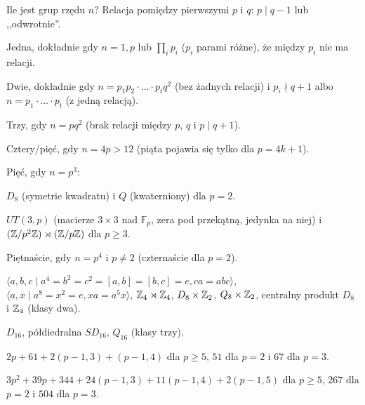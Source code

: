 Ile jest grup rzędu $n$?
Relacja pomiędzy pierwszymi $p$ i $q$: $p \mid q - 1$ lub ,,odwrotnie''.
\begin{itemx}
	\item {\color{Blue} Jedna}, dokładnie gdy $n = 1, p$ lub $\prod_i p_i$ ($p_i$ parami różne), że między $p_i$ nie ma relacji.
	\item {\color{Blue} Dwie}, dokładnie gdy $n = p_1 p_2 \cdot \ldots \cdot p_t q^2$ (bez żadnych relacji) i $p_i \nmid q + 1$ albo $n = p_1\cdot \ldots \cdot p_t$ (z jedną relacją).
	\item {\color{Blue} Trzy}, gdy $n = pq^2$ (brak relacji między $p$, $q$ i $p \mid q + 1$).
	\item {\color{Blue} Cztery/pięć}, gdy $n = 4p > 12$ (piąta pojawia się tylko dla $p = 4k+1$).
	\item {\color{Blue} Pięć}, gdy $n = p^3$:
	\begin{itemx}
	\item $D_8$ (symetrie kwadratu) i $Q$ (kwaterniony) dla $p = 2$.
	\item $UT(3, p)$ (macierze $3 \times 3$ nad $\mathbb F_p$, zera pod przekątną, jedynka na niej) i $(\mathbb{Z}/p^2\mathbb{Z}) \rtimes (\mathbb{Z}/p\mathbb{Z})$ dla $p \ge 3$.
	\end{itemx} 
	\item {\color{Blue} Piętnaście}, gdy $n = p^4$ i $p \neq 2$ (czternaście dla $p = 2$).
	\begin{itemx}
	\item $\langle a,b,c \mid a^4 = b^2 = c^2 = [a,b] = [b,c] = e, ca = abc\rangle$, $\langle a, x \mid a^8 = x^2 = e, xa = a^5x\rangle$, $\mathbb{Z}_4 \rtimes \mathbb{Z}_4$, $D_8 \times \mathbb{Z}_2$, $Q_8 \times \mathbb{Z}_2$, centralny produkt $D_8$ i $\mathbb{Z}_4$ (klasy dwa).
	\item $D_{16}$, półdiedralna $SD_{16}$, $Q_{16}$ (klasy trzy).
	\end{itemx}
	\item {\color{Blue} $2p + 61 + 2(p - 1, 3) + (p-1, 4)$} dla $p \ge 5$, $51$ dla $p = 2$ i $67$ dla $p = 3$.
	\item {\color{Blue} $3p^2 + 39p + 344 + 24(p-1,3) + 11(p-1, 4) + 2(p-1, 5)$} dla $p \ge 5$, $267$ dla $p = 2$ i $504$ dla $p = 3$.
\end{itemx}